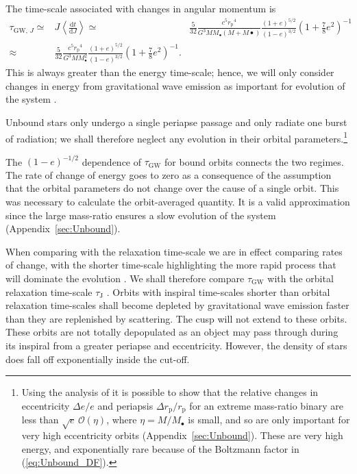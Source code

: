 \documentclass[useAMS,usedcolumn,usegraphicx,usenatbib]{mn2e}
\newcommand{\eqnref}[1]{(\ref{eq:#1})}
\newcommand{\apref}[1]{Appendix~\ref{sec:#1}}
\newcommand{\sub}[1]{\ensuremath{_\mathrm{#1}}}
\newcommand{\dd}{\ensuremath{\mathrm{d}}}
\newcommand{\diff}[2]{\ensuremath{\frac{\dd {#1}}{\dd {#2}}}}
\newcommand{\order}[1]{\ensuremath{\mathcal{O}({#1})}}
\begin{document}
The time-scale associated with changes in angular momentum is \citep{Peters1964}
\begin{align}
\tau_{\mathrm{GW},\, J} \simeq {} & J\left\langle\diff{t}{J}\right\rangle
 \simeq {} & \frac{5}{32}\frac{c^5r\sub{p}^4}{G^3MM_\bullet\left(M + M\bullet\right)}\frac{(1+e)^{5/2}}{(1-e)^{3/2}}\left(1+\frac{7}{8}e^2\right)^{-1} \\
 \approx {} & \frac{5}{32}\frac{c^5r\sub{p}^4}{G^3MM_\bullet^2}\frac{(1+e)^{5/2}}{(1-e)^{3/2}}\left(1+\frac{7}{8}e^2\right)^{-1}.
\end{align}
This is always greater than the energy time-scale; hence, we will only consider changes in energy from gravitational wave emission as important for evolution of the system \citep{Hopman2005}.

Unbound stars only undergo a single periapse passage and only radiate one burst of radiation; we shall therefore neglect any evolution in their orbital parameters.\footnote{Using the analysis of \citet{Turner1977} it is possible to show that the relative changes in eccentricity $\Delta e / e$ and periapsis $\Delta r\sub{p} / r\sub{p}$ for an extreme mass-ratio binary are less than $\sqrt{e}\,\order{\eta}$, where $\eta = M/M_\bullet$ is small, and so are only important for very high eccentricity orbits (\apref{Unbound}). These are very high energy, and exponentially rare because of the Boltzmann factor in \eqnref{Unbound_DF}.}

The $(1-e)^{-1/2}$ dependence of $\tau\sub{GW}$ for bound orbits connects the two regimes. The rate of change of energy goes to zero as a consequence of the assumption that the orbital parameters do not change over the cause of a single orbit. This was necessary to calculate the orbit-averaged quantity. It is a valid approximation since the large mass-ratio ensures a slow evolution of the system (\apref{Unbound}).

When comparing with the relaxation time-scale we are in effect comparing rates of change, with the shorter time-scale highlighting the more rapid process that will dominate the evolution \citep{Amaro-Seoane2007}. We shall therefore compare $\tau\sub{GW}$ with the orbital relaxation time-scale $\tau\sub{J}$ \citep{Merritt2011}. Orbits with inspiral time-scales shorter than orbital relaxation time-scales shall become depleted by gravitational wave emission faster than they are replenished by scattering. The cusp will not extend to these orbits. These orbits are not totally depopulated as an object may pass through during its inspiral from a greater periapse and eccentricity. However, the density of stars does fall off exponentially inside the cut-off.
\end{document}
